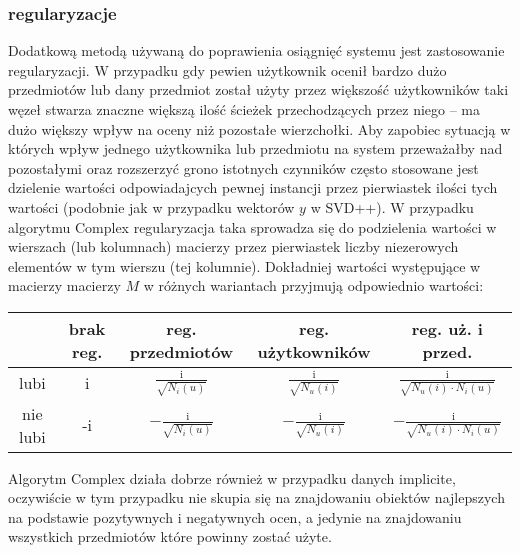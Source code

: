\documentclass{pracamgr}
\begin{document}
    \subsubsection{regularyzacje}
     Dodatkową metodą używaną do poprawienia osiągnięć systemu jest zastosowanie regularyzacji.
     W przypadku gdy pewien użytkownik ocenił bardzo dużo przedmiotów lub dany przedmiot został użyty przez większość użytkowników taki węzeł
     stwarza znaczne większą ilość ścieżek przechodzących przez niego -- ma dużo większy wpływ na oceny niż pozostałe wierzchołki.
     Aby zapobiec sytuacją w których wpływ jednego użytkownika lub przedmiotu na system przeważałby nad pozostałymi oraz rozszerzyć
     grono istotnych czynników często stosowane jest dzielenie wartości odpowiadajcych pewnej instancji przez pierwiastek ilości tych wartości
     (podobnie jak w przypadku wektorów $y$ w SVD++).
     W przypadku algorytmu Complex regularyzacja taka sprowadza się do podzielenia wartości w wierszach (lub kolumnach) macierzy przez pierwiastek liczby
     niezerowych elementów w tym wierszu (tej kolumnie). Dokładniej wartości występujące w macierzy macierzy $M$ w różnych wariantach przyjmują odpowiednio
     wartości:
     \begin{center}
      \begin{tabular}{|c|c|c|c|c|}
       \hline
         & brak reg. & reg. przedmiotów & reg. użytkowników & reg. uż. i przed. \\
       \hline
        lubi & i &  $\frac{\text{i}}{\sqrt{N_{i}(u)}}$& $\frac{\text{i}}{\sqrt{N_{u}(i)}}$ & $\frac{\text{i}}{\sqrt{N_{u}(i)\cdot N_{i}(u)}}$  \\
       \hline
        nie lubi & -i & $-\frac{\text{i}}{\sqrt{N_{i}(u)}}$ &  $-\frac{\text{i}}{\sqrt{N_{u}(i)}}$ & $-\frac{\text{i}}{\sqrt{N_{u}(i)\cdot N_{i}(u)}}$  \\    
       \hline
      \end{tabular}
     \end{center}
     \vspace{16pt}
     Algorytm Complex działa dobrze również w przypadku danych implicite, oczywiście w tym przypadku nie skupia się na znajdowaniu obiektów najlepszych
     na podstawie pozytywnych i negatywnych ocen, a jedynie na znajdowaniu wszystkich przedmiotów które powinny zostać użyte.\newpage
    
    
    
    
\end{document}
